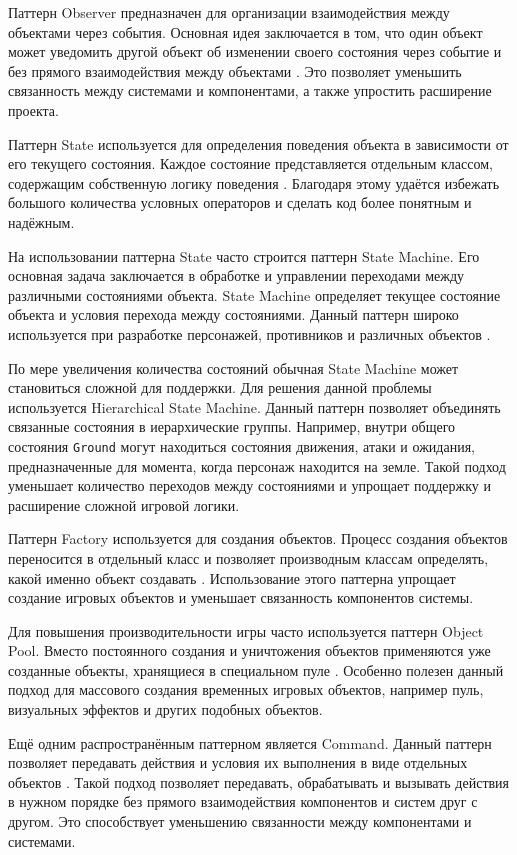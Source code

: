 \documentclass[a4paper,12pt]{report}
\begin{document}
Паттерн Observer предназначен для организации взаимодействия между объектами через события. Основная идея заключается в том, что один объект может уведомить другой объект об изменении своего состояния через событие и без прямого взаимодействия между объектами \cite{nystrom2014}. Это позволяет уменьшить связанность между системами и компонентами, а также упростить расширение проекта.

Паттерн State используется для определения поведения объекта в зависимости от его текущего состояния. Каждое состояние представляется отдельным классом, содержащим собственную логику поведения \cite{baron2021}. Благодаря этому удаётся избежать большого количества условных операторов и сделать код более понятным и надёжным.

На использовании паттерна State часто строится паттерн State Machine. Его основная задача заключается в обработке и управлении переходами между различными состояниями объекта. State Machine определяет текущее состояние объекта и условия перехода между состояниями. Данный паттерн широко используется при разработке персонажей, противников и различных объектов \cite{weimann_patterns}.

По мере увеличения количества состояний обычная State Machine может становиться сложной для поддержки. Для решения данной проблемы используется Hierarchical State Machine. Данный паттерн позволяет объединять связанные состояния в иерархические группы. Например, внутри общего состояния \texttt{Ground} могут находиться состояния движения, атаки и ожидания, предназначенные для момента, когда персонаж находится на земле. Такой подход уменьшает количество переходов между состояниями и упрощает поддержку и расширение сложной игровой логики.

Паттерн Factory используется для создания объектов. Процесс создания объектов переносится в отдельный класс и позволяет производным классам определять, какой именно объект создавать \cite{lin_patterns}. Использование этого паттерна упрощает создание игровых объектов и уменьшает связанность компонентов системы.

Для повышения производительности игры часто используется паттерн Object Pool. Вместо постоянного создания и уничтожения объектов применяются уже созданные объекты, хранящиеся в специальном пуле \cite{nystrom2014}. Особенно полезен данный подход для массового создания временных игровых объектов, например пуль, визуальных эффектов и других подобных объектов.

Ещё одним распространённым паттерном является Command. Данный паттерн позволяет передавать действия и условия их выполнения в виде отдельных объектов \cite{nystrom2014}. Такой подход позволяет передавать, обрабатывать и вызывать действия в нужном порядке без прямого взаимодействия компонентов и систем друг с другом. Это способствует уменьшению связанности между компонентами и системами.
\end{document}
